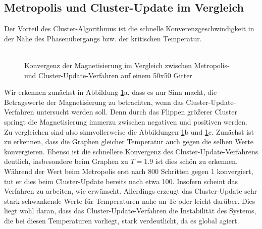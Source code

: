 \subsection{Metropolis und Cluster-Update im Vergleich}
Der Vorteil des Cluster-Algorithmus ist die schnelle Konverenzgeschwindigkeit in der Nähe des Phasenübergangs bzw. der kritischen Temperatur.\\\\

\begin{figure}[H]
	\centering
	\caption{Konvergenz der Magnetisierung im Vergleich zwischen Metropolis- und Cluster-Update-Verfahren auf einem 50x50 Gitter}
	\label{cu2d2steps}
\end{figure}

Wir erkennen zunächst in Abbildung \ref{cu2d2steps}a, dass es nur Sinn macht, die Betragswerte der Magnetisierung zu betrachten, wenn das Cluster-Update-Verfahren untersucht werden soll. Denn durch das Flippen größerer Cluster springt die Magnetisierung immerzu zwischen negativen und positiven werden.\\
Zu vergleichen sind also sinnvollerweise die Abbildungen \ref{cu2d2steps}b und \ref{cu2d2steps}c. Zunächst ist zu erkennen, dass die Graphen gleicher Temperatur auch gegen die selben Werte konvergieren. Ebenso ist die schnellere Konvergenz des Cluster-Update-Verfahrens deutlich, insbesondere beim Graphen zu $T=1.9$ ist dies schön zu erkennen. Während der Wert beim Metropolis erst nach 800 Schritten gegen 1 konvergiert, tut er dies beim Cluster-Update bereits nach etwa 100. Insofern scheint das Verfahren zu arbeiten, wie erwünscht. Allerdings erzeugt das Cluster-Update sehr stark schwankende Werte für Temperaturen  nahe an Tc oder leicht darüber. Dies liegt wohl daran, dass das Cluster-Update-Verfahren die Instabilität des Systems, die bei diesen Temperaturen vorliegt, stark verdeutlicht, da es global agiert.

